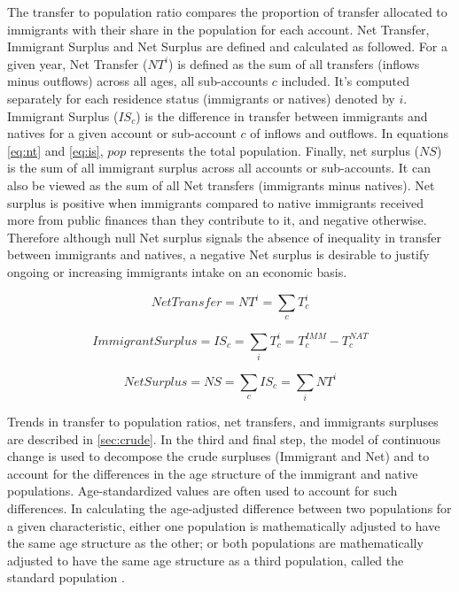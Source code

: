 The transfer to population ratio compares the proportion of transfer allocated to immigrants with their share in the population for each account.
Net Transfer, Immigrant Surplus and Net Surplus are defined and calculated as followed.
For a given year, Net Transfer (\(NT^{i}\)) is defined as the sum of all transfers (inflows minus outflows) across all ages, all sub-accounts \(c \) included.
It's computed separately for each residence status (immigrants or natives) denoted by \(i \).
Immigrant Surplus (\(IS_{c}\)) is the difference in transfer between immigrants and natives for a given account or sub-account \(c \) of inflows and outflows.
In equations \eqref{eq:nt} and \eqref{eq:is}, \( pop \) represents the total population.
Finally, net surplus (\( NS \)) is the sum of all immigrant surplus across all accounts or sub-accounts.
It can also be viewed as the sum of all Net transfers (immigrants minus natives).
Net surplus is positive when immigrants compared to native immigrants received more from public finances than they contribute to it, and negative otherwise.
Therefore although null Net surplus signals the absence of inequality in transfer between immigrants and natives, a negative Net surplus is desirable to justify ongoing or increasing immigrants intake on an economic basis.

\begin{equation}\label{eq:nt}
  Net Transfer=NT^{i}= \displaystyle\sum_{c}T^{i}_{c}
\end{equation}

\begin{equation}\label{eq:is}
  Immigrant Surplus=IS_{c}= \displaystyle\sum_{i}T^{i}_{c}=T^{IMM}_{c}-T^{NAT}_{c}
\end{equation}

\begin{equation}\label{eq:ns}
  Net Surplus = NS = \displaystyle\sum_{c}IS_{c} = \displaystyle\sum_{i}NT^{i}
\end{equation}

Trends in transfer to population ratios, net transfers, and immigrants surpluses are described in \autoref{sec:crude}.
In the third and final step, the model of continuous change \citep{Horiuchi:2008cn} is used to decompose the crude surpluses (Immigrant and Net) and to account for the differences in the age structure of the immigrant and native populations.
Age-standardized values are often used to account for such differences.
In calculating the age-adjusted difference between two populations for a given characteristic, either one population is mathematically adjusted to have the same age structure as the other; or both populations are mathematically adjusted to have the same age structure as a third population, called the standard population \citet{statCan:001}.

